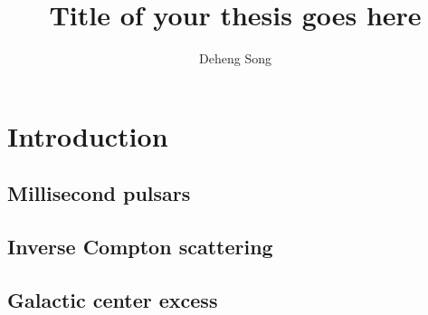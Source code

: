 \documentclass[doublespace,draft,nopageskip]{VTthesis} %
\title{Title of your thesis goes here}
\author{Deheng Song}
\begin{document}
\frontmatter
\maketitle
\tableofcontents

\listoffigures
\listoftables





\mainmatter

\chapter{Introduction} \label{ch:introduction}
\lipsum[1-2]

\section{Millisecond pulsars} \label{se:one_section}
\lipsum[1-4]
\section{Inverse Compton scattering} \label{se:another_section}
\lipsum[1-4]
\section{Galactic center excess}
\lipsum[1-4]
\end{document}
